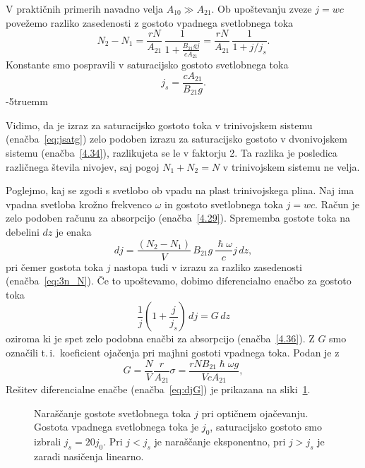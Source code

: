 V praktičnih primerih navadno velja $A_{10}\gg A_{21}$. Ob upoštevanju zveze $j=wc$ povežemo
razliko zasedenosti z gostoto vpadnega svetlobnega toka
\begin{equation}
N_{2}-N_{1}=\frac{rN}{A_{21}} \, \frac{1}{1+\frac{B_{21}gj}{c A_{21}}} = 
\frac{rN}{A_{21}} \, \frac{1}{1+j/j_s}.
\label{eq:3n_N}
\end{equation}
Konstante smo pospravili v saturacijsko gostoto svetlobnega toka 
\begin{equation}
j_s = \frac{c A_{21}}{B_{21}g}.
\label{eq:jsatg}
\end{equation}
\vglue-5truemm
\begin{remark}
 Vidimo, da je  izraz za saturacijsko gostoto toka v trinivojskem sistemu 
 (enačba~\ref{eq:jsatg}) zelo podoben izrazu za saturacijsko gostoto v dvonivojskem
 sistemu (enačba~\ref{4.34}), razlikujeta se le
v faktorju 2. Ta razlika je posledica različnega števila nivojev, saj pogoj $N_{1}+N_{2}=N$
v trinivojskem sistemu ne velja. 
\end{remark}
Poglejmo, kaj se zgodi s svetlobo ob vpadu na plast trinivojskega plina. Naj ima vpadna
svetloba krožno frekvenco $\omega$ in gostoto svetlobnega toka $j=wc$. Račun je zelo podoben 
računu za absorpcijo (enačba~\ref{4.29}). Sprememba gostote toka na debelini $dz$ je enaka
\begin{equation}
dj=\frac{(N_{2}-N_{1})}{V}\, B_{21}g\, \frac{\hslash\omega}{c}j\, dz,
\label{eq:dj}
\end{equation}
pri čemer gostota toka $j$ nastopa tudi v izrazu za razliko
zasedenosti (enačba~\ref{eq:3n_N}). Če to upoštevamo, 
dobimo diferencialno enačbo za gostoto toka
\begin{equation}
\frac{1}{j}\left(1+\frac{j}{j_{s}}\right)\, dj=G\, dz
\label{4.43}
\end{equation}
oziroma
ki je spet zelo podobna enačbi za absorpcijo (enačba~\ref{4.36}).
Z $G$ smo označili t.\,i.\, koeficient ojačenja pri majhni gostoti vpadnega
toka. Podan je z 
\begin{equation}
G=\frac{N}{V}\frac{r}{A_{21}}\sigma=\frac{rNB_{21}\hslash\omega g}{VcA_{21}},
\label{4.44}
\end{equation}
Rešitev diferencialne enačbe (enačba~\ref{eq:djG}) je prikazana na sliki~\ref{fig:ojacanje}. 
\begin{figure}[h]
\centering
\def\svgwidth{80truemm} 

\caption{Naraščanje gostote svetlobnega toka $j$ pri optičnem ojačevanju. 
Gostota vpadnega svetlobnega toka je $j_0$, saturacijsko
gostoto smo izbrali $j_s = 20 j_0$. Pri $j<j_s$ je naraščanje eksponentno, 
pri $j>j_s$ je zaradi nasičenja linearno.
}
\label{fig:ojacanje}
\end{figure}

